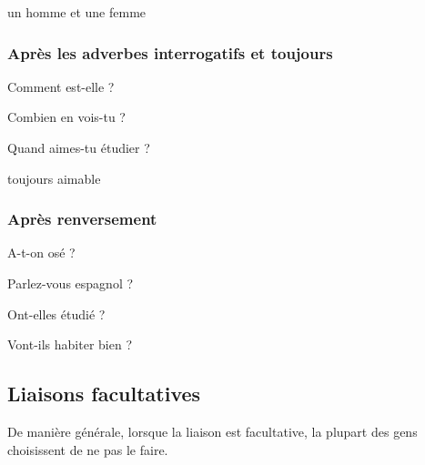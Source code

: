 \documentclass{article}
\begin{document}
un homme et une femme 

\subsubsection{Après les adverbes interrogatifs et toujours}

Comment est-elle ?	\textipa{[kO m\~a e  tEl]}

Combien en vois-tu ?	\textipa{[k\~O bj\~E \~a vwa ty]}

Quand aimes-tu étudier ? \textipa{[k\~a Em ty e ty dje]}

toujours aimable  \textipa{[tu Zu rE mabl]}

\subsubsection{Après renversement}

A-t-on osé ?	\textipa{[a t\~O o ze]}

Parlez-vous espagnol ?	

Ont-elles étudié ?	\textipa{[\~O tE le ty die]}

Vont-ils habiter bien ?	\textipa{[v\~O ti la bi te bj\~E]}

\subsection{Liaisons facultatives}

De manière générale, lorsque la liaison est facultative, la plupart des gens choisissent de ne pas le faire.
\end{document}
